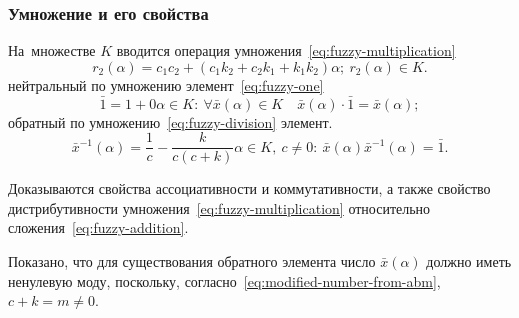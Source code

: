 \documentclass[12pt]{beamer}
\begin{document}
\begin{frame}
  \frametitle{Умножение и его свойства}
  На~множестве $K$ вводится операция умножения~\eqref{eq:fuzzy-multiplication}
\begin{equation}
\label{eq:fuzzy-multiplication}
  r_2\left( \alpha \right)=c_1 c_2+\left(c_1 k_2+ c_2 k_1 +k_1 k_2 \right)\alpha;\ r_2\left( \alpha  \right)\in K.
\end{equation}
нейтральный по умножению элемент~\eqref{eq:fuzzy-one} 
\begin{equation}
  \label{eq:fuzzy-one}
  \bar{1}=1+0\alpha \in K:\ \forall \bar{x}\left( \alpha  \right)\in K\quad \bar{x}\left( \alpha  \right)\cdot \bar{1}=\bar{x}\left( \alpha  \right);
\end{equation}
обратный по умножению~\eqref{eq:fuzzy-division} элемент. 
\begin{equation}
  \label{eq:fuzzy-division}
  \bar{x}^{-1}(\alpha )=\frac{1}{c}-\frac{k}{c\left(c+k\right)}\alpha \in K,\ c\ne 0:\ \bar{x}\left(\alpha \right){{\bar{x}}^{-1}}\left( \alpha  \right)=\bar{1}.
\end{equation}

Доказываются свойства ассоциативности и коммутативности, а также свойство дистрибутивности умножения~\eqref{eq:fuzzy-multiplication} относительно сложения~\eqref{eq:fuzzy-addition}. 

Показано, что для существования обратного элемента число $\bar{x}\left( \alpha  \right)$ должно иметь ненулевую моду, поскольку, согласно~\eqref{eq:modified-number-from-abm}, $c+k=m\ne 0$.
\end{frame}
\end{document}
